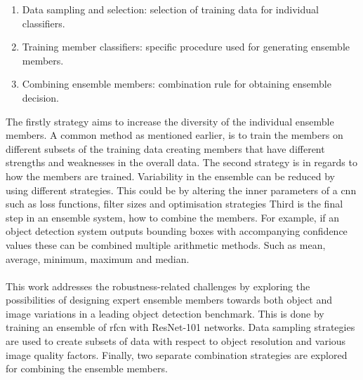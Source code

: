 \documentclass[a4paper,twoside]{article}
\begin{document}
\begin{enumerate}
	\item Data sampling and selection: selection of training data for individual classifiers.
	\item Training member classifiers: specific procedure used for generating ensemble members.
	\item Combining ensemble members: combination rule for obtaining ensemble decision.
\end{enumerate}

The firstly strategy aims to increase the diversity of the individual ensemble members. A common method as mentioned earlier, is to train the members on different subsets of the training data creating members that have different strengths and weaknesses in the overall data. The second strategy is in regards to how the members are trained. Variability in the ensemble can be reduced by using different strategies. This could be by altering the inner parameters of a \gls{cnn} such as loss functions, filter sizes and optimisation strategies Third is the final step in an ensemble system, how to combine the members. For example, if an object detection system outputs bounding boxes with accompanying confidence values these can be combined multiple arithmetic methods. Such as mean, average, minimum, maximum and median.
\\\\
This work addresses the robustness-related challenges by exploring the possibilities of designing expert ensemble members towards both object and image variations in a leading object detection benchmark. This is done by training an ensemble of \gls{rfcn} with ResNet-101 networks. Data sampling strategies are used to create subsets of data with respect to object resolution and various image quality factors. Finally, two separate combination strategies are explored for combining the ensemble members.
\end{document}
